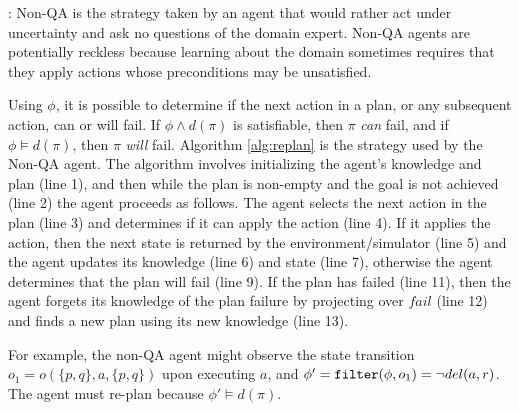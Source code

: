 \documentclass[letterpaper]{article}
\def\und#1{\noindent{\bf #1}:}
\def\goalie{{\tt Goalie}}
\begin{document}
\und{Non-QA} Non-QA is the strategy taken by an agent that would rather act
under uncertainty and ask no questions of the domain expert.  Non-QA agents are
potentially reckless because learning about the domain sometimes requires that
they apply actions whose preconditions may be unsatisfied.  

Using $\phi$, it is possible to determine if the next action in a plan, or any
subsequent action, can or will fail.  If  $\phi \wedge d(\pi)$ is
satisfiable, then $\pi$ {\em can} fail, and if $\phi \models d(\pi)$,
then $\pi$ {\em will}  fail.  
Algorithm \ref{alg:replan} is the strategy used by the Non-QA agent.  The
algorithm involves initializing the agent's knowledge and plan (line 1), and then while
the plan is non-empty and the goal is not achieved (line 2) the agent proceeds
as follows.  The agent selects the next action in the plan (line 3) and
determines if it can apply the action (line 4).  If it applies the action, then
the next state is returned by the environment/simulator (line 5) and the agent
updates its knowledge (line 6) and state (line 7),
otherwise the agent determines that the plan will fail (line 9).  If the plan
has failed (line 11), then the agent forgets its knowledge of the plan failure
by projecting over $fail$ (line 12) and finds a new plan using its new knowledge
(line 13).

For example, the non-QA agent might observe the state transition $o_1
= o(\{p,q\}, a, \{p,q\})$ upon executing $a$, and $\phi' = {\tt filter}(\phi,
o_1) = \neg del(a, r)$.  The agent must re-plan because $\phi' \models d(\pi)$.

\end{document}
